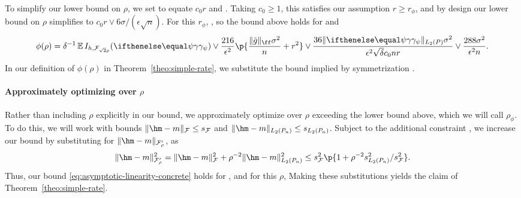 To simplify our lower bound on $\rho$, we set 
to equate $c_0 r$ and . Taking $c_0 \ge 1$, 
this satisfies our assumption $r \ge r_{\phi}$, and by design our lower bound on $\rho$ simplifies 
to $c_0 r \vee  6 \sigma/(\epsilon \sqrt{n})$. For this $r_{\phi}$,
 ,
so the bound above holds for  and
\[
\phi(\rho) = \delta^{-1}\E I_{h,\F_{\sqrt{2}\rho}}(\riesz[\psi]) 
	  \vee \frac{216}{\epsilon^2}\p{\frac{\norm{\gapprox}_{\ff}\sigma^2}{n} + r^2} 
          \vee \frac{36\norm{\riesz[\psi]}_{L_2(\P)}\sigma^2}{\epsilon^2\sqrt{\delta} c_0 nr} \vee \frac{288\sigma^2}{\epsilon^2 n}. 
\]
In our definition of $\phi(\rho)$ in Theorem~\ref{theo:simple-rate}, we substitute the bound   implied by symmetrization \citep[Lemma 2.3.1]{vandervaart-wellner1996:weak-convergence}.

\paragraph*{Approximately optimizing over $\rho$}
Rather than including $\rho$ explicitly in our bound, 
we approximately optimize over $\rho$ exceeding the lower bound above, which we will call $\rho_{\phi}$.
To do this, we will work with bounds $\norm{\hm - m}_{\F} \le s_{\F}$ and $\norm{\hm-m}_{L_2(\Pn)} \le s_{L_2(\Pn)}$.
Subject to the additional constraint , 
we increase our bound by substituting  for $\norm{\hm - m}_{\F_{\rho}'}$, as
\[ \norm{\hm - m}_{\F'_{\rho}}^2 = \norm{\hm - m}_{\F}^2 + \rho^{-2}\norm{\hm - m}_{L_2(\Pn)}^2 
			         \le s_{\F}^2\p{1+ \rho^{-2}s_{L_2(\Pn)}^2/s_{\F}^2}.\]
Thus, our bound \eqref{eq:asymptotic-linearity-concrete} holds for
, 
and for this $\rho$, 
Making these substitutions yields the claim of Theorem~\ref{theo:simple-rate}. 

